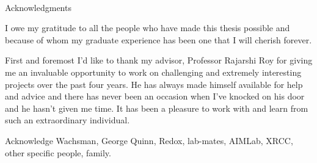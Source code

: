 

\renewcommand{\baselinestretch}{2}
\small\normalsize
\hbox{\ }

\vspace{-.65in}

\begin{center}
\large{Acknowledgments}
\end{center}

\vspace{1ex}

I owe my gratitude to all the people who have made this thesis possible and because of whom my graduate experience has been one that I will cherish forever.

First and foremost I'd like to thank my advisor, Professor Rajarshi Roy for giving me an invaluable opportunity to work on challenging and extremely interesting projects over the past four years. He has always made himself available for help and advice and there has never been an occasion when I've knocked on his door and he hasn't given me time. It has been a pleasure to work with and learn from such an extraordinary individual.

Acknowledge Wachsman, George Quinn, Redox, lab-mates, AIMLab, XRCC, other specific people, family.

\lipsum[2-4]
